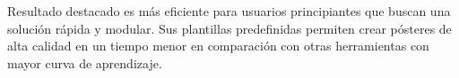 \vspace{-1em}
\begin{alertblock}{Resultado destacado}
     es más eficiente para usuarios principiantes que buscan una solución rápida y modular.
    Sus plantillas predefinidas permiten crear pósteres de alta calidad en un tiempo
    menor en comparación con otras herramientas con mayor curva de aprendizaje.
\end{alertblock}
